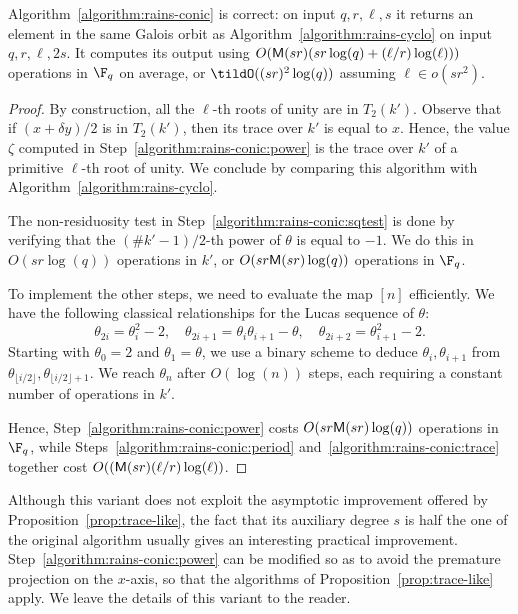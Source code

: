\begin{proposition}
  Algorithm~\ref{algorithm:rains-conic} is correct: on input
  $q,r,\ell,s$ it returns an element in the same Galois orbit as
  Algorithm~\ref{algorithm:rains-cyclo} on input $q,r,\ell,2s$. %
  It computes its output using $O(\mathsf{M}(sr)(sr\log(q)+(\ell/r)\log(\ell)))$
  operations in $\F_q$ on average, or $\tildO((sr)^2\log(q))$ assuming
  $\ell\in o(sr^2)$.
\end{proposition}
\begin{proof}
  By construction, all the $\ell$-th roots of unity are in
  $T_2(k')$. %
  Observe that if $(x+\delta y)/2$ is in $T_2(k')$, then its trace
  over $k'$ is equal to $x$. %
  Hence, the value $\zeta$ computed in
  Step~\ref{algorithm:rains-conic:power} is the trace over $k'$ of a
  primitive $\ell$-th root of unity. %
  We conclude by comparing this algorithm with
  Algorithm~\ref{algorithm:rains-cyclo}.

  The non-residuosity test in Step~\ref{algorithm:rains-conic:sqtest}
  is done by verifying that the $(\#k'-1)/2$-th power of $\theta$ is
  equal to $-1$. %
  We do this in $O(sr\log(q))$ operations in $k'$, or
  $O(sr\mathsf{M}(sr)\log(q))$ operations in $\F_q$.

  To implement the other steps, we need to evaluate the map $[n]$
  efficiently. %
  We have the following classical relationships for the Lucas sequence
  of $\theta$:
  \begin{equation*}
    \theta_{2i} = \theta_{i}^2-2,\quad
    \theta_{2i+1} = \theta_i\theta_{i+1} - \theta,\quad
    \theta_{2i+2} = \theta_{i+1}^2-2.
  \end{equation*}
  Starting with $\theta_0=2$ and $\theta_1=\theta$, we use a binary
  scheme to deduce $\theta_i,\theta_{i+1}$ from
  $\theta_{\lfloor i/2\rfloor},\theta_{\lfloor i/2\rfloor+1}$. %
  We reach $\theta_n$ after $O(\log(n))$ steps, each requiring a
  constant number of operations in $k'$.

  Hence, Step~\ref{algorithm:rains-conic:power} costs
  $O(sr\mathsf{M}(sr)\log(q))$ operations in $\F_q$, while
  Steps~\ref{algorithm:rains-conic:period}
  and~\ref{algorithm:rains-conic:trace} together cost
  $O((\mathsf{M}(sr)(\ell/r)\log(\ell))$.
\end{proof}

Although this variant does not exploit the asymptotic improvement
offered by Proposition~\ref{prop:trace-like}, the fact that its
auxiliary degree $s$ is half the one of the original algorithm usually
gives an interesting practical improvement. %
Step~\ref{algorithm:rains-conic:power} can be modified so as to avoid
the premature projection on the $x$-axis, so that the algorithms of
Proposition~\ref{prop:trace-like} apply. %
We leave the details of this variant to the reader.







